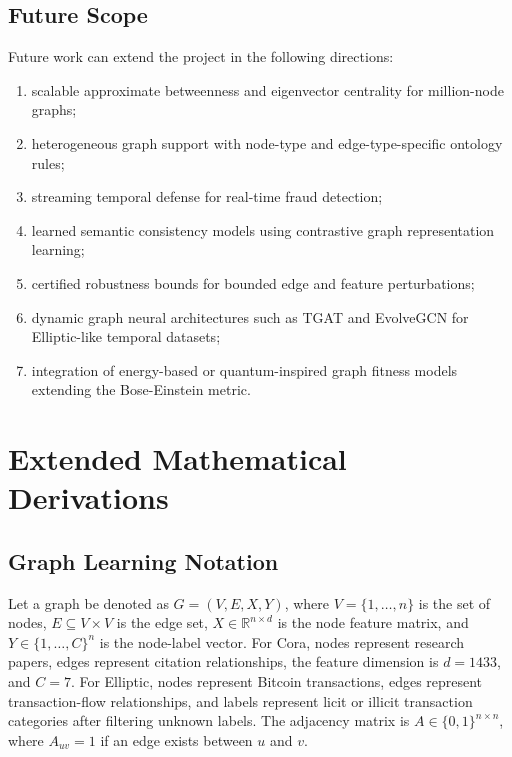 \documentclass[12pt,oneside]{report}
\begin{document}
\section{Future Scope}
Future work can extend the project in the following directions:
\begin{enumerate}
    \item scalable approximate betweenness and eigenvector centrality for million-node graphs;
    \item heterogeneous graph support with node-type and edge-type-specific ontology rules;
    \item streaming temporal defense for real-time fraud detection;
    \item learned semantic consistency models using contrastive graph representation learning;
    \item certified robustness bounds for bounded edge and feature perturbations;
    \item dynamic graph neural architectures such as TGAT and EvolveGCN for Elliptic-like temporal datasets;
    \item integration of energy-based or quantum-inspired graph fitness models extending the Bose-Einstein metric.
\end{enumerate}

\appendix

\chapter{Extended Mathematical Derivations}

\section{Graph Learning Notation}
Let a graph be denoted as $G=(V,E,X,Y)$, where $V=\{1,\ldots,n\}$ is the set of nodes, $E\subseteq V\times V$ is the edge set, $X\in\mathbb{R}^{n\times d}$ is the node feature matrix, and $Y\in\{1,\ldots,C\}^{n}$ is the node-label vector. For Cora, nodes represent research papers, edges represent citation relationships, the feature dimension is $d=1433$, and $C=7$. For Elliptic, nodes represent Bitcoin transactions, edges represent transaction-flow relationships, and labels represent licit or illicit transaction categories after filtering unknown labels. The adjacency matrix is $A\in\{0,1\}^{n\times n}$, where $A_{uv}=1$ if an edge exists between $u$ and $v$.
\end{document}
